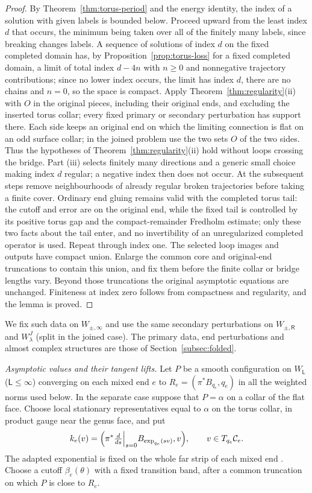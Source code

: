 \documentclass[11pt]{amsart}
\theoremstyle{definition}
\theoremstyle{remark}
\theoremstyle{plain}
\numberwithin{equation}{section}
\begin{document}
\begin{proof}
By Theorem~\ref{thm:torus-period} and the energy identity, the index of a solution
with given labels is bounded below. Proceed upward from the least index $d$ that
occurs, the minimum being taken over all of the finitely many labels, since breaking
changes labels. A sequence of solutions of index $d$ on the fixed completed domain has, by
Proposition~\ref{prop:torus-loss} for a fixed completed domain, a limit of total
index $d-4n$ with $n\ge0$ and nonnegative trajectory contributions; since no lower
index occurs, the limit has index $d$, there are no chains and $n=0$, so the space
is compact. Apply Theorem~\ref{thm:regularity}(ii) with $O$ in the
original pieces, including their original ends, and excluding the
inserted torus collar; every fixed primary or secondary perturbation has
support there. Each side keeps an original end on which the limiting
connection is flat on an odd surface collar; in the joined problem use the
two sets $O$ of the two sides. Thus the hypotheses of
Theorem~\ref{thm:regularity}(ii) hold without loops crossing the bridge. Part (iii) selects finitely many directions and
a generic small choice making index $d$ regular; a negative index
then does not occur. At the subsequent steps remove neighbourhoods
of already regular broken trajectories before taking a finite cover.
Ordinary end gluing remains valid with the completed torus tail:
the cutoff and error are on the original end, while the fixed tail
is controlled by its positive torus gap and the compact-remainder
Fredholm estimate; only these two facts about the tail enter, and no invertibility of an
unregularized completed operator is used.
Repeat through index one. The selected loop images and outputs have
compact union. Enlarge the common core and original-end truncations
to contain this union, and fix them before the finite collar or
bridge lengths vary. Beyond those truncations the original
asymptotic equations are unchanged. Finiteness at index zero follows from compactness and
regularity, and the lemma is proved.
\end{proof}

We fix such data on $W_{\pm,\infty}$ and use the same secondary perturbations on
$W_{\pm,\mathsf R}$ and $W^J_\lambda$ (split in the joined case). The primary data, end perturbations and almost complex structures are those of Section~\ref{subsec:folded}.

\emph{Asymptotic values and their tangent lifts.}
Let $P$ be a smooth configuration on $W_\mathsf L$
($\mathsf L\le\infty$) converging on each mixed end $e$ to
$R_e=(\pi^*B_{q_e},q_e)$ in all the weighted norms used below.
In the separate case suppose that $P=\alpha$ on a collar of the
flat face. Choose local stationary representatives equal to $\alpha$
on the torus collar, in product gauge near the genus face, and
put
\[
k_e(v)=\Bigl(\pi^*\tfrac{d}{ds}\Big|_{s=0}
 B_{\exp_{q_e}(sv)},v\Bigr),\qquad v\in T_{q_e}\mathcal C_e.
\]
The adapted exponential is fixed on the whole far strip of each
mixed end \cite[Lemma~4.4 and Section~4.1]{DFL}. Choose a cutoff
$\beta_e(\theta)$ with a fixed transition band, after a common
truncation on which $P$ is close to $R_e$.
\end{document}
